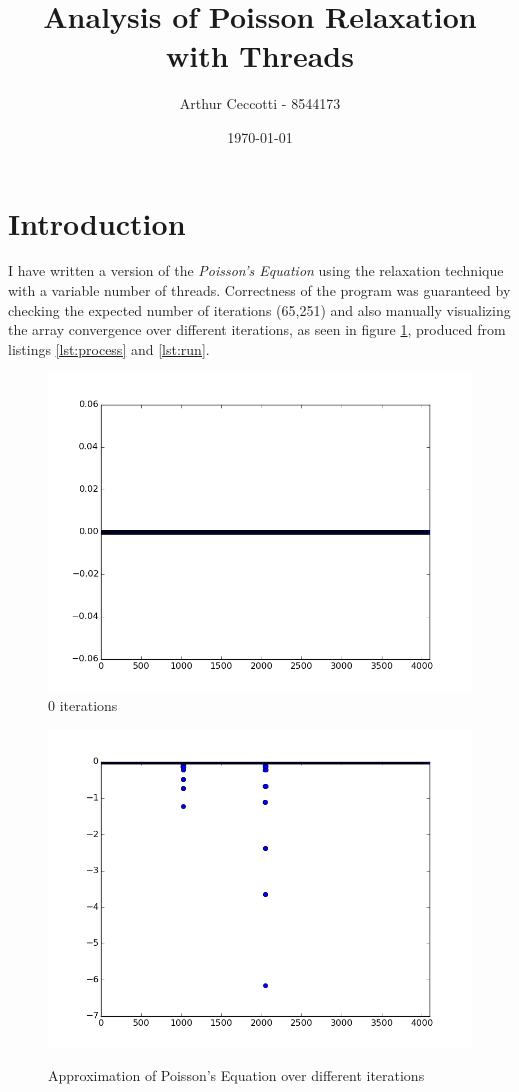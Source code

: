 \documentclass{article}
\title{Analysis of Poisson Relaxation with Threads}
\date{\today}
\author{Arthur Ceccotti - 8544173}
\begin{document}
\maketitle

\section{Introduction}
I have written a version of the \textit{Poisson's Equation} using the relaxation technique with a variable number of threads. Correctness of the program was guaranteed by checking the expected number of iterations (65,251) and also manually visualizing the array convergence over different iterations, as seen in figure \ref{fig:iterations}, produced from listings \ref{lst:process} and \ref{lst:run}.

\begin{figure}
\label{fig:iterations}
\caption{Approximation of Poisson's Equation over different iterations}
\centering
\begin{minipage}{0.45\textwidth}
  \centering
  \includegraphics[width=1\linewidth, natwidth=800, natheight=600]{graphs/it1.png}\\
  0 iterations
\end{minipage}
\begin{minipage}{0.45\textwidth}
  \centering
  \includegraphics[width=1\linewidth, natwidth=800, natheight=600]{graphs/it10.png}\\

\end{minipage}
\end{figure}
\end{document}
